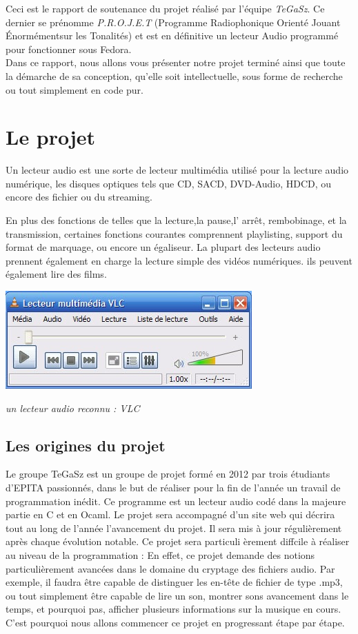 \documentclass[12pt,a4paper]{report}
\begin{document}
Ceci est le rapport de soutenance du projet réalisé par l'équipe \emph{TeGaSz}. 
Ce dernier se prénomme \emph{P.R.O.J.E.T} (Programme Radiophonique Orienté Jouant Énormémentsur les Tonalités) et est en définitive un lecteur Audio programmé pour fonctionner sous Fedora. \\
Dans ce rapport, nous allons vous présenter notre projet terminé ainsi
que toute la démarche de sa conception, qu'elle soit intellectuelle, sous forme de 
recherche ou tout simplement en code pur.

\chapter{Le projet}
Un lecteur audio est une sorte de lecteur multimédia utilisé pour la lecture audio numérique, les disques optiques tels que CD, SACD, DVD-Audio, HDCD, ou encore  des fichier ou du streaming.

En plus des fonctions de telles que la lecture,la pause,l' arrêt, rembobinage, et la transmission, certaines fonctions courantes comprennent playlisting, support du format de marquage, ou encore un égaliseur.
La plupart des lecteurs audio prennent également en charge la lecture simple des vidéos numériques. ils peuvent également lire des films.

\begin{center}
\includegraphics{vlc-interface1.jpg}

\it{un lecteur audio reconnu : VLC}
\end{center}

\section{Les origines du projet}

Le groupe TeGaSz est un groupe de projet formé en 2012 par trois étudiants
d'EPITA passionnés, dans le but de réaliser pour la fin de l'année un
travail de programmation inédit. Ce programme est un lecteur audio codé
dans la majeure partie en C et en Ocaml. Le projet sera accompagné d'un
site web qui décrira tout au long de l'année l'avancement du projet. Il sera
mis à jour régulièrement après chaque évolution notable. Ce projet sera particuli
èrement diffcile à réaliser au niveau de la programmation : En effet, ce
projet demande des notions particulièrement avancées dans le domaine du
cryptage des fichiers audio. Par exemple, il faudra être capable de distinguer
les en-tête de fichier de type .mp3, ou tout simplement être capable de lire
un son, montrer sons avancement dans le temps, et pourquoi pas, afficher
plusieurs informations sur la musique en cours. C'est pourquoi nous allons
commencer ce projet en progressant étape par étape.
\end{document}

